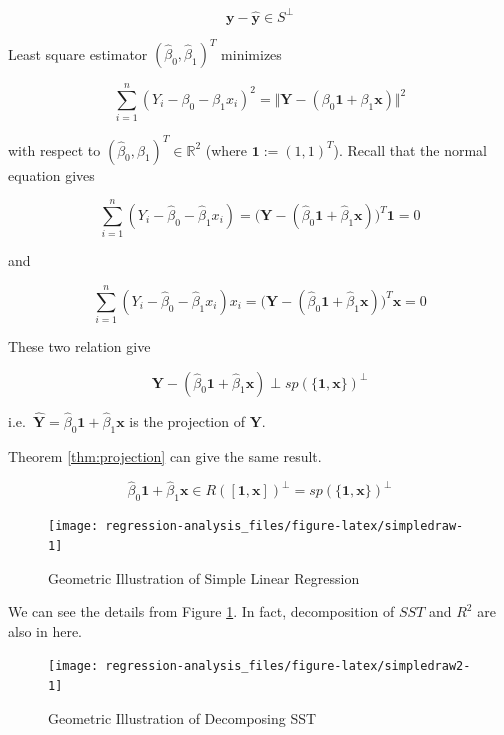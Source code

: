 \documentclass[]{book}
\theoremstyle{definition}
\theoremstyle{definition}
\theoremstyle{definition}
\theoremstyle{remark}
\begin{document}
\[\mathbf{y} - \mathbf{\hat{y}} \in S^{\perp}\]

Least square estimator \((\hat\beta_0, \hat\beta_1)^T\) minimizes

\begin{equation}
  \sum_{i = 1}^n (Y_i - \beta_0 - \beta_1 x_i)^2 = \Vert \mathbf{Y} - (\beta_0 \mathbf{1} + \beta_1 \mathbf{x}) \Vert^2
  \label{eq:qmatrix}
\end{equation}

with respect to \((\hat\beta_0, \hat\beta_1)^T \in \mathbb{R}^2\) (where \(\mathbf{1} := (1, 1)^T\)). Recall that the normal equation gives

\[\sum_{i = 1}^n(Y_i - \hat\beta_0 - \hat\beta_1 x_i) = \Big( \mathbf{Y} - (\hat\beta_0 \mathbf{1} + \hat\beta_1 \mathbf{x}) \Big)^T \mathbf{1} = 0\]

and

\[\sum_{i = 1}^n (Y_i - \hat\beta_0 - \hat\beta_1 x_i)x_i = \Big( \mathbf{Y} - (\hat\beta_0 \mathbf{1} + \hat\beta_1 \mathbf{x}) \Big)^T \mathbf{x} = 0\]

These two relation give

\[\mathbf{Y} - (\hat\beta_0 \mathbf{1} + \hat\beta_1 \mathbf{x}) \perp sp(\{ \mathbf{1}, \mathbf{x} \})^{\perp}\]

i.e.~\(\mathbf{\hat{Y}} = \hat\beta_0 \mathbf{1} + \hat\beta_1 \mathbf{x}\) is the projection of \(\mathbf{Y}\).

Theorem \ref{thm:projection} can give the same result.

\[\hat\beta_0 \mathbf{1} + \hat\beta_1 \mathbf{x} \in R([\mathbf{1}, \mathbf{x}])^{\perp} = sp(\{ \mathbf{1}, \mathbf{x} \})^{\perp}\]

\begin{figure}[H]

{\centering \texttt{[image: regression-analysis\_files/figure-latex/simpledraw-1]} 

}

\caption{Geometric Illustration of Simple Linear Regression}\label{fig:simpledraw}
\end{figure}

We can see the details from Figure \ref{fig:simpledraw}. In fact, decomposition of \(SST\) and \(R^2\) are also in here.

\begin{figure}[H]

{\centering \texttt{[image: regression-analysis\_files/figure-latex/simpledraw2-1]} 

}

\caption{Geometric Illustration of Decomposing SST}\label{fig:simpledraw2}
\end{figure}
\end{document}
